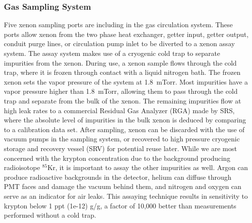 \subsubsection{Gas Sampling System} 

Five xenon sampling ports are including in the gas circulation system.  These ports allow xenon from the two phase heat exchanger, getter input, getter output, conduit purge lines, or circulation pump inlet to be diverted to a xenon assay system.  The assay system makes use of a cryogenic cold trap to separate impurities from the xenon.  During use, a xenon sample flows through the cold trap, where it is frozen through contact with a liquid nitrogen bath.  The frozen xenon sets the vapor pressure of the system at 1.8~mTorr. Most impurities have a vapor pressure higher than 1.8~mTorr, allowing them to pass through the cold trap and separate from the bulk of the xenon.  The remaining impurities flow at high leak rates to a commercial Residual Gas Analyzer (RGA) made by SRS, where the absolute level of impurities in the bulk xenon is deduced by comparing to a calibration data set.  After sampling, xenon can be discarded with the use of vacuum pumps in the sampling system, or recovered to high pressure cryogenic storage and recovery vessel (SRV) for potential reuse later.  While we are most concerned with the krypton concentration due to the background producing radioisotope $^{85}$Kr, it is important to assay the other impurities as well.  Argon can produce radioactive backgrounds in the detector, helium can diffuse through PMT faces and damage the vacuum behind them, and nitrogen and oxygen can serve as an indicator for air leaks.  This assaying technique results in sensitivity to krypton below 1 ppt (1e-12) g/g, a factor of 10,000 better than measurements performed without a cold trap.

